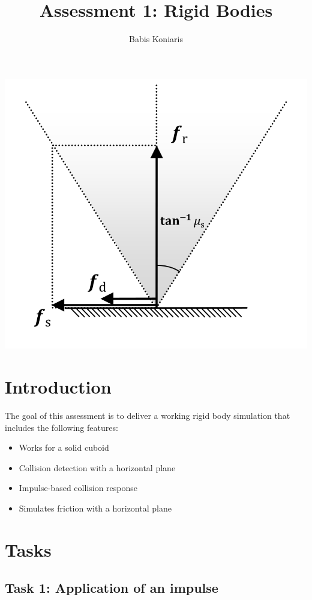 \documentclass[12pt]{article}
\title{\textbf{Assessment 1: Rigid Bodies}}
\author{Babis Koniaris}
\date{}
\begin{document}
\maketitle

\begin{center}
\includegraphics[width=\textwidth]{p8-teaser.png}
\end{center}
\pagebreak

\section*{Introduction}

The goal of this assessment is to deliver a working rigid body simulation that includes the
following features:

\begin{itemize}
\item Works for a solid cuboid
\item Collision detection with a horizontal plane
\item Impulse-based collision response
\item Simulates friction with a horizontal plane
\end{itemize}

\section*{Tasks}

\subsection*{Task 1: Application of an impulse}
\end{document}
